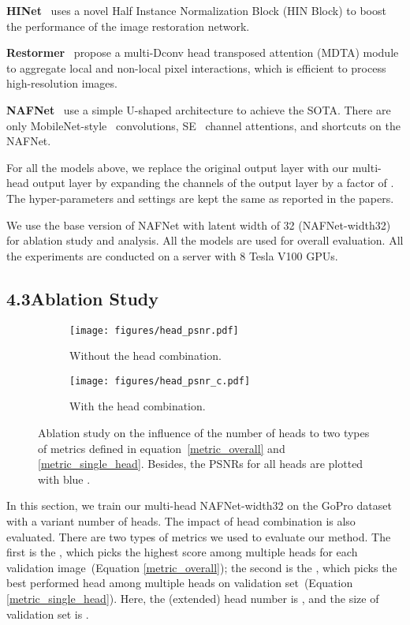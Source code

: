 \documentclass[letterpaper]{article} \usepackage{aaai23}  \usepackage{times}  \usepackage{helvet}  \usepackage{courier}  \usepackage[hyphens]{url}  \usepackage{graphicx} \urlstyle{rm} \def\UrlFont{\rm}  \usepackage{natbib}  \usepackage{caption} \frenchspacing  \setlength{\pdfpagewidth}{8.5in} \setlength{\pdfpageheight}{11in} \usepackage{algorithm}
\begin{document}
\textbf{HINet}~\cite{chen2021hinet} uses a novel Half Instance Normalization Block (HIN Block) to boost the performance of the image restoration network. 

\textbf{Restormer}~\cite{zamir2022restormer} propose a multi-Dconv head transposed attention (MDTA) module to aggregate local and non-local pixel interactions, which is efficient to process high-resolution images. 

\textbf{NAFNet}~\cite{chen2022simple} use a simple U-shaped architecture to achieve the SOTA. 
There are only MobileNet-style~\cite{howard2017mobilenets} convolutions, SE~\cite{hu2018squeeze} channel attentions, and shortcuts on the NAFNet.

For all the models above, we replace the original output layer with our multi-head output layer by expanding the channels of the output layer by a factor of . The hyper-parameters and settings are kept the same as reported in the papers.

We use the base version of NAFNet with latent width of 32 (NAFNet-width32) for ablation study and analysis. All the models are used for overall evaluation. All the experiments are conducted on a server with 8 Tesla V100 GPUs.

\subsection{4.3\quad Ablation Study}

\begin{figure}[t]
    \centering
    \begin{subfigure}[b]{1\columnwidth}
        \centering
        \texttt{[image: figures/head\_psnr.pdf]}
        \caption{Without the head combination.}
        \label{fig:head_psnr}
    \end{subfigure}
    \begin{subfigure}[b]{1\columnwidth}
        \centering
        \texttt{[image: figures/head\_psnr\_c.pdf]}
        \caption{With the head combination.}
        \label{fig:head_psnr_c}
    \end{subfigure}
    \caption{Ablation study on the influence of the number of heads to two types of metrics defined in equation~\ref{metric_overall} and \ref{metric_single_head}. Besides, the PSNRs for all heads are plotted with blue .}
    \label{fig:head_psnrs}
\end{figure}




In this section, we train our multi-head NAFNet-width32 on the GoPro dataset with a variant number of heads. The impact of head combination is also evaluated. There are two types of metrics we used to evaluate our method. The first is the , which picks the highest score among multiple heads for each validation image~(Equation \ref{metric_overall}); the second is the , which picks the best performed head among multiple heads on validation set~(Equation \ref{metric_single_head}). Here, the (extended) head number is , and the size of validation set is .
\end{document}
